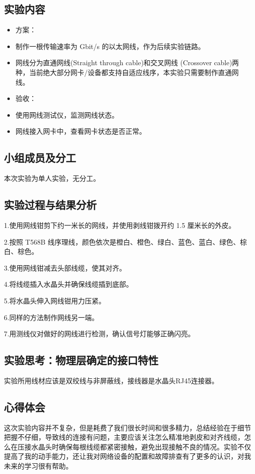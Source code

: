 \documentclass{article}
\begin{document}
\subsection{实验内容}
\begin{itemize}
    \item 方案：
    \item 制作一根传输速率为 Gbit/s 的以太网线，作为后续实验链路。
    \item 网线分为直通网线(Straight through cable)和交叉网线
    (Crossover cable)两种，当前绝大部分网卡/设备都支持自适应线序，本实验只需要制作直通网线。
    \item 验收：
    \item 使用网线测试仪，监测网线状态。
    \item 网线接入网卡中，查看网卡状态是否正常。
\end{itemize}
\subsection{小组成员及分工}
本次实验为单人实验，无分工。
\subsection{实验过程与结果分析}
1.使用网线钳剪下约一米长的网线，并使用剥线钳拨开约 1.5 厘米长的外皮。

2.按照 T568B 线序理线，颜色依次是橙白、橙色、绿白、蓝色、蓝白、绿色、棕白、棕色。

3.使用网线钳减去头部线缆，使其对齐。

4.将线缆插入水晶头并确保线缆插到底部。

5.将水晶头伸入网线钳用力压紧。

6.同样的方法制作网线另一端。

7.用测线仪对做好的网线进行检测，确认信号灯能够正确闪亮。
\subsection{实验思考：物理层确定的接口特性}
实验所用线材应该是双绞线与非屏蔽线，接线器是水晶头RJ45连接器。
\subsection{心得体会}
这次实验内容并不复杂，但是耗费了我们很长时间和很多精力，总结经验在于细节把握不仔细，导致线的连接有问题，主要应该关注怎么精准地剥皮和对齐线缆，怎么在压接水晶头时确保每根线缆都紧密接触，避免出现接触不良的情况。实验不仅提高了我的动手能力，还让我对网络设备的配置和故障排查有了更多的认识，对我未来的学习很有帮助。
\end{document}
